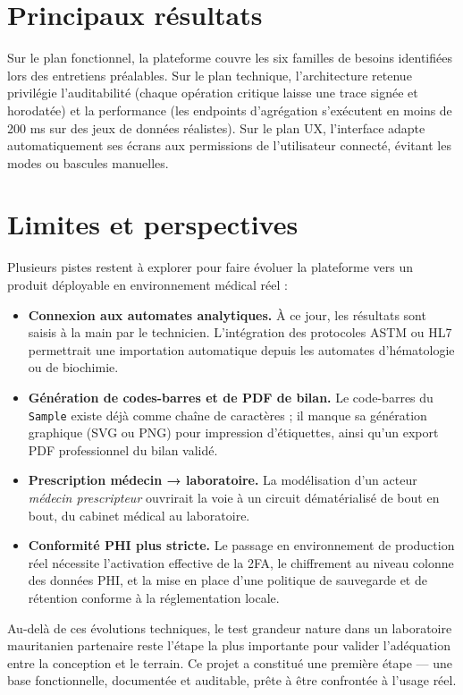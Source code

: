 \documentclass[12pt, a4paper, oneside]{report}
\begin{document}
\section*{Principaux résultats}
Sur le plan fonctionnel, la plateforme couvre les six familles de
besoins identifiées lors des entretiens préalables. Sur le plan
technique, l'architecture retenue privilégie l'auditabilité (chaque
opération critique laisse une trace signée et horodatée) et la
performance (les endpoints d'agrégation s'exécutent en moins de
200 ms sur des jeux de données réalistes). Sur le plan UX, l'interface
adapte automatiquement ses écrans aux permissions de l'utilisateur
connecté, évitant les modes ou bascules manuelles.

\section*{Limites et perspectives}
Plusieurs pistes restent à explorer pour faire évoluer la plateforme
vers un produit déployable en environnement médical réel :

\begin{itemize}
  \item \textbf{Connexion aux automates analytiques.} À ce jour, les
        résultats sont saisis à la main par le technicien.
        L'intégration des protocoles ASTM ou HL7 permettrait une
        importation automatique depuis les automates d'hématologie ou
        de biochimie.
  \item \textbf{Génération de codes-barres et de PDF de bilan.} Le
        code-barres du \texttt{Sample} existe déjà comme chaîne de
        caractères ; il manque sa génération graphique (SVG ou PNG)
        pour impression d'étiquettes, ainsi qu'un export PDF
        professionnel du bilan validé.
  \item \textbf{Prescription médecin → laboratoire.} La modélisation
        d'un acteur \emph{médecin prescripteur} ouvrirait la voie à un
        circuit dématérialisé de bout en bout, du cabinet médical au
        laboratoire.
  \item \textbf{Conformité PHI plus stricte.} Le passage en
        environnement de production réel nécessite l'activation
        effective de la 2FA, le chiffrement au niveau colonne des
        données PHI, et la mise en place d'une politique de
        sauvegarde et de rétention conforme à la réglementation
        locale.
\end{itemize}

Au-delà de ces évolutions techniques, le test grandeur nature dans
un laboratoire mauritanien partenaire reste l'étape la plus
importante pour valider l'adéquation entre la conception et le
terrain. Ce projet a constitué une première étape — une base
fonctionnelle, documentée et auditable, prête à être confrontée à
l'usage réel.
\end{document}
